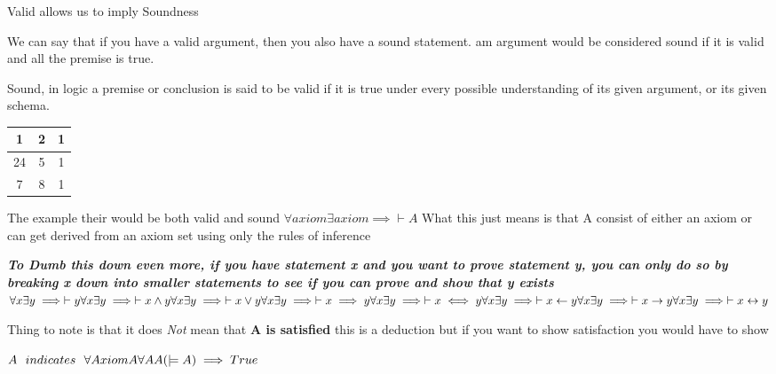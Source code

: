\documentclass{article}
\theoremstyle{mytheoremstyle}
\theoremstyle{mytheoremstyle}
\theoremstyle{myproblemstyle}
\begin{document}
\begin{definition}
	Valid allows us to imply Soundness

	We can say that if you have a valid argument, then you also have a sound statement.
	am argument would be considered sound if it is valid and all the premise is true.
\end{definition}

\begin{definition}
	Sound, in logic a premise or conclusion is said to be valid if it is true under every possible understanding of its given argument, or its given schema.
	\begin{center}
		\begin{tabular}{ c c c }
			1  & 2 & 1 \\
			\hline
			24 & 5 & 1 \\
			\hline
			7  & 8 & 1
		\end{tabular}
	\end{center}

	The example their would be both valid and sound
	\begin{math}
		\forall axiom \exists axiom \implies \vdash A
	\end{math}
	What this just means is that A consist of either an axiom or can get derived from an axiom set using only the rules of inference

	\textbf{\textit{To Dumb this down even more, if you have statement x and you want to prove statement y, you can only do so by breaking x down into smaller statements to see if you can prove and show that y exists}}
	\\
	\begin{math}
		\forall x \exists y \implies \vdash y  \\
		\forall x \exists y \implies \vdash x \land y \\
		\forall x \exists y \implies \vdash x \lor y \\
		\forall x \exists y \implies \vdash x \implies y \\
		\forall x \exists y \implies \vdash x \iff y \\
		\forall x \exists y \implies \vdash x \leftarrow y \\
		\forall x \exists y \implies \vdash x \rightarrow y \\
		\forall x \exists y \implies \vdash x \leftrightarrow y \\
	\end{math}

	Thing to note is that it does \textit{Not} mean that \textbf{A is satisfied} this is a deduction but if you want to show satisfaction you would have to show

	\begin{math}
		A \ \ indicates \ \ \forall Axiom A \\
		\forall A A(\models A) \implies True
	\end{math}

\end{definition}
\end{document}
